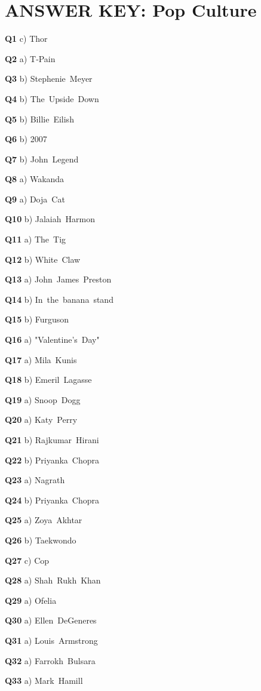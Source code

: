 \section{ANSWER KEY: Pop Culture}

\textbf{Q1} c) Thor\par
\textbf{Q2} a) T‑Pain\par
\textbf{Q3} b) Stephenie Meyer\par
\textbf{Q4} b) The Upside Down\par
\textbf{Q5} b) Billie Eilish\par
\textbf{Q6} b) 2007\par
\textbf{Q7} b) John Legend\par
\textbf{Q8} a) Wakanda\par
\textbf{Q9} a) Doja Cat\par
\textbf{Q10} b) Jalaiah Harmon\par
\textbf{Q11} a) The Tig\par
\textbf{Q12} b) White Claw\par
\textbf{Q13} a) John James Preston\par
\textbf{Q14} b) In the banana stand\par
\textbf{Q15} b) Furguson\par
\textbf{Q16} a) "Valentine's Day"\par
\textbf{Q17} a) Mila Kunis\par
\textbf{Q18} b) Emeril Lagasse\par
\textbf{Q19} a) Snoop Dogg\par
\textbf{Q20} a) Katy Perry\par
\textbf{Q21} b) Rajkumar Hirani\par
\textbf{Q22} b) Priyanka Chopra\par
\textbf{Q23} a) Nagrath\par
\textbf{Q24} b) Priyanka Chopra\par
\textbf{Q25} a) Zoya Akhtar\par
\textbf{Q26} b) Taekwondo\par
\textbf{Q27} c) Cop\par
\textbf{Q28} a) Shah Rukh Khan\par
\textbf{Q29} a) Ofelia\par
\textbf{Q30} a) Ellen DeGeneres\par
\textbf{Q31} a) Louis Armstrong\par
\textbf{Q32} a) Farrokh Bulsara\par
\textbf{Q33} a) Mark Hamill\par
